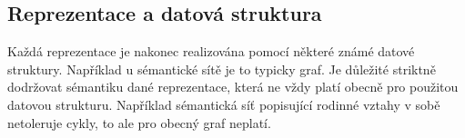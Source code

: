 \subsection{Reprezentace a datová struktura}
Každá reprezentace je nakonec realizována pomocí některé známé datové struktury. Například u sémantické sítě je to typicky graf. Je důležité striktně dodržovat sémantiku dané reprezentace, která ne vždy platí obecně pro použitou datovou strukturu. Například sémantická síť popisující rodinné vztahy v sobě netoleruje cykly, to ale pro obecný graf neplatí. \cite{cite:09}




